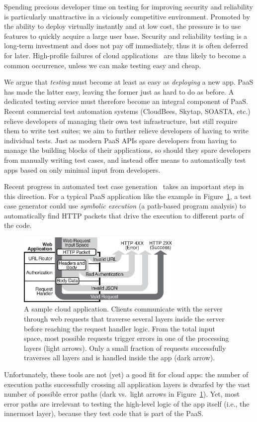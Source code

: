 Spending precious developer time on testing for improving security and reliability is particularly unattractive in a viciously competitive environment.  Promoted by the ability to deploy virtually instantly and at low cost, the pressure is to use features to quickly acquire a large user base. Security and reliability testing is a long-term investment and does not pay off immediately, thus it is often deferred for later.
%
High-profile failures of cloud applications~\cite{bugs-linkedin,bugs-gmail} are thus likely to become a common occurrence, unless we can make testing easy and cheap.

We argue that {\em testing} must become at least as easy as {\em deploying} a new app. PaaS has made the latter easy, leaving the former just as hard to do as before.  A dedicated testing service must therefore become an integral component of PaaS.
%
Recent commercial test automation systems (CloudBees, Skytap, SOASTA, etc.) relieve developers of managing their own test infrastructure, but still require them to write test suites; we aim to further relieve developers of having to write individual tests.
%
Just as modern PaaS APIs spare developers from having to manage the building blocks of their applications, so should they spare developers from manually writing test cases, and instead offer means to automatically test apps based on only minimal input from developers.

Recent progress in automated test case generation~\cite{klee,godefroid:fuzz,tillmann-pex} takes an important step in this direction.  For a typical PaaS application like the example in Figure~\ref{fig:running-example}, a test case generator could use \textit{symbolic execution} (a path-based program analysis) to automatically find HTTP packets that drive the execution to different parts of the code.
%
\begin{figure}
  \centering
  \includegraphics[width=3.1in]{figures/paas/web-flow}
  \caption{A sample cloud application.  Clients communicate with the server through web requests that traverse several layers inside the server before reaching the request handler logic.  From the total input space, most possible requests trigger errors in one of the processing layers (light arrows).  Only a small fraction of requests successfully traverses all layers and is handled inside the app (dark arrow).}
  \label{fig:running-example}
  \vspace{5pt}
\end{figure}
%
Unfortunately, these tools are not (yet) a good fit for cloud apps: the number of execution paths successfully crossing all application layers is dwarfed by the vast number of possible error paths (dark vs.~light arrows in Figure~\ref{fig:running-example}).  Yet, most error paths are irrelevant to testing the high-level logic of the app itself (i.e., the innermost layer), because they test code that is part of the PaaS.

